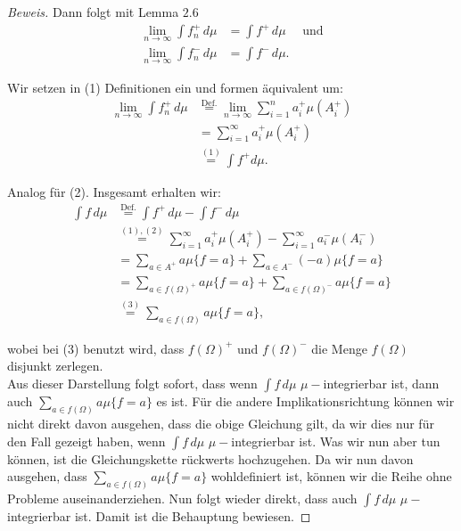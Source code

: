 \documentclass[10pt]{article}
\begin{document}
\begin{proof}[Beweis]
  Dann folgt mit Lemma $2.6$ 
  \begin{align}
    \lim_{n\to\infty} \int f_n^{+} \,d\mu &= \int f^{+} \,d\mu \quad \text{ und} \\
    \lim_{n\to\infty} \int f_n^{-} \,d\mu &= \int f^{-} \,d\mu. 
  \end{align}

  Wir setzen in (1) Definitionen ein und formen äquivalent um:
  \begin{align*}
    \lim_{n\to\infty} \int f_n^{+} \,d\mu &\overset{\text{Def.}}{=} \lim_{n\to\infty}\sum_{i=1}^{n} a_i^{+}\mu(A_i^+) \\
                                          &= \sum_{i=1}^{\infty} a_i^{+}\mu(A_i^+) \\
                                          &\overset{(1)}{=} \int f^+ d\mu .
  \end{align*}

  Analog für (2). Insgesamt erhalten wir:
  \begin{align*}
    \int f\,d\mu &\overset{\text{Def.}}{=} \int f^+\,d\mu - \int f^-\,d\mu \\
                 &\overset{(1),(2)}{=}  \sum_{i=1}^{\infty} a_i^{+}\mu(A_i^+) - \sum_{i=1}^{\infty} a_i^{-}\mu(A_i^-) \\
                 &= \sum_{a\in A^+} a\mu\{f = a\} + \sum_{a\in A^-} (-a)\mu\{f = a\} \\
                 &= \sum_{a\in f(\Omega)^+} a\mu\{f = a\} + \sum_{a\in f(\Omega)^-} a\mu\{f = a\} \\
                 &\overset{(3)}{=} \sum_{a\in f(\Omega)} a \mu\{f = a\},
  \end{align*}

  wobei bei (3) benutzt wird, dass $f(\Omega)^+$ und $f(\Omega)^-$ die Menge $f(\Omega)$ disjunkt zerlegen.  \\
  Aus dieser Darstellung folgt sofort, dass wenn $\int f\,d\mu$ $\mu-$integrierbar ist, dann auch
  $\sum_{a\in f(\Omega)} a \mu\{f = a\}$ es ist. Für die andere Implikationsrichtung können wir 
  nicht direkt davon ausgehen, dass die obige Gleichung gilt, da wir dies nur für den Fall gezeigt haben, 
  wenn $\int f\,d\mu$ $\mu-$integrierbar ist. Was wir nun aber tun können, ist die Gleichungskette rückwerts 
  hochzugehen. Da wir nun davon ausgehen, dass $\sum_{a\in f(\Omega)} a \mu\{f = a\}$ wohldefiniert ist, 
  können wir die Reihe ohne Probleme auseinanderziehen. Nun folgt wieder direkt, dass auch $\int f\,d\mu$ $\mu-$integrierbar ist. 
  Damit ist die Behauptung bewiesen.
\end{proof}
\end{document}
